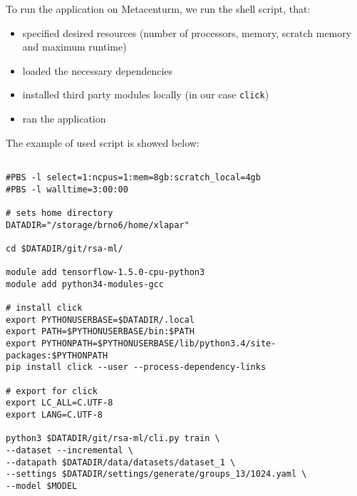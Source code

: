 To run the application on Metacenturm, we run the shell script, that:

\begin{itemize}

\item specified desired resources (number of processors, memory, scratch memory and maximum runtime)

\item loaded the necessary dependencies

\item installed third party modules locally (in our case \texttt{click})

\item ran the application

\end{itemize}

\noindent
The example of used script is showed below:

\begin{verbatim}

#PBS -l select=1:ncpus=1:mem=8gb:scratch_local=4gb
#PBS -l walltime=3:00:00

# sets home directory
DATADIR="/storage/brno6/home/xlapar"

cd $DATADIR/git/rsa-ml/

module add tensorflow-1.5.0-cpu-python3
module add python34-modules-gcc

# install click
export PYTHONUSERBASE=$DATADIR/.local
export PATH=$PYTHONUSERBASE/bin:$PATH
export PYTHONPATH=$PYTHONUSERBASE/lib/python3.4/site-packages:$PYTHONPATH
pip install click --user --process-dependency-links

# export for click
export LC_ALL=C.UTF-8
export LANG=C.UTF-8

python3 $DATADIR/git/rsa-ml/cli.py train \
--dataset --incremental \
--datapath $DATADIR/data/datasets/dataset_1 \
--settings $DATADIR/settings/generate/groups_13/1024.yaml \
--model $MODEL

\end{verbatim}









